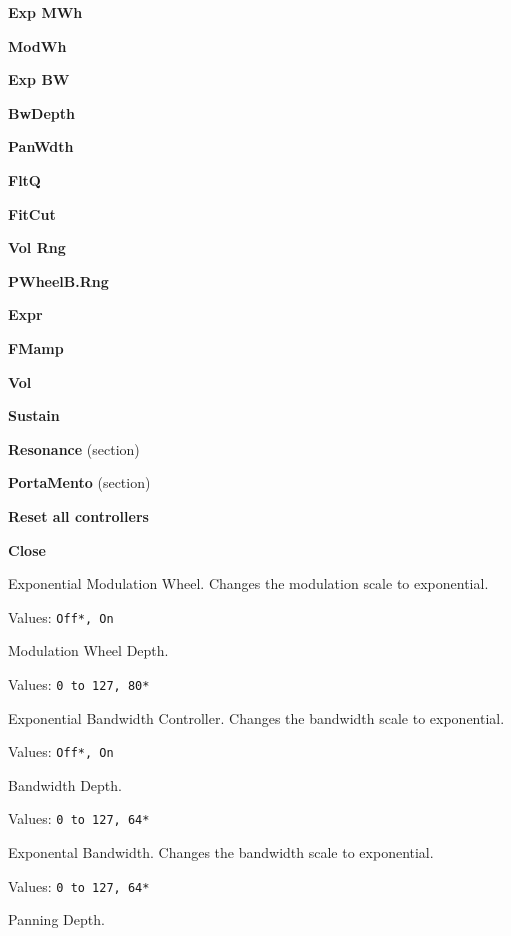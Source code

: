    \begin{enumber}
      \item \textbf{Exp MWh}
      \item \textbf{ModWh}
      \item \textbf{Exp BW}
      \item \textbf{BwDepth}
      \item \textbf{PanWdth}
      \item \textbf{FltQ}
      \item \textbf{FitCut}
      \item \textbf{Vol Rng}
      \item \textbf{PWheelB.Rng}
      \item \textbf{Expr}
      \item \textbf{FMamp}
      \item \textbf{Vol}
      \item \textbf{Sustain}
      \item \textbf{Resonance} (section)
      \item \textbf{PortaMento} (section)
      \item \textbf{Reset all controllers}
      \item \textbf{Close}
   \end{enumber}

   \setcounter{ItemCounter}{0}      %

   Exponential Modulation Wheel.
   Changes the modulation scale to exponential.

   Values: \texttt{Off*, On}

   Modulation Wheel Depth.

   Values: \texttt{0 to 127, 80*}

   Exponential Bandwidth Controller.
   Changes the bandwidth scale to exponential.

   Values: \texttt{Off*, On}

   Bandwidth Depth.

   Values: \texttt{0 to 127, 64*}

   Exponental Bandwidth.
   Changes the bandwidth scale to exponential.

   Values: \texttt{0 to 127, 64*}

   Panning Depth.

